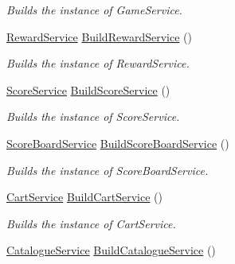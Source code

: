 \begin{DoxyCompactItemize}
\begin{DoxyCompactList}\small\item\em Builds the instance of Game\+Service. \end{DoxyCompactList}\item 
\hyperlink{classcom_1_1shephertz_1_1app42_1_1paas_1_1sdk_1_1csharp_1_1reward_1_1_reward_service}{Reward\+Service} \hyperlink{classcom_1_1shephertz_1_1app42_1_1paas_1_1sdk_1_1csharp_1_1_service_a_p_i_a2e03bda67eea7674af14efbcc43b5c02}{Build\+Reward\+Service} ()
\begin{DoxyCompactList}\small\item\em Builds the instance of Reward\+Service. \end{DoxyCompactList}\item 
\hyperlink{classcom_1_1shephertz_1_1app42_1_1paas_1_1sdk_1_1csharp_1_1game_1_1_score_service}{Score\+Service} \hyperlink{classcom_1_1shephertz_1_1app42_1_1paas_1_1sdk_1_1csharp_1_1_service_a_p_i_afb32cca0b10ba7b2dff5e0f0be9362ea}{Build\+Score\+Service} ()
\begin{DoxyCompactList}\small\item\em Builds the instance of Score\+Service. \end{DoxyCompactList}\item 
\hyperlink{classcom_1_1shephertz_1_1app42_1_1paas_1_1sdk_1_1csharp_1_1game_1_1_score_board_service}{Score\+Board\+Service} \hyperlink{classcom_1_1shephertz_1_1app42_1_1paas_1_1sdk_1_1csharp_1_1_service_a_p_i_a1a3c3f63cdb298efb3fa1cdff556b637}{Build\+Score\+Board\+Service} ()
\begin{DoxyCompactList}\small\item\em Builds the instance of Score\+Board\+Service. \end{DoxyCompactList}\item 
\hyperlink{classcom_1_1shephertz_1_1app42_1_1paas_1_1sdk_1_1csharp_1_1shopping_1_1_cart_service}{Cart\+Service} \hyperlink{classcom_1_1shephertz_1_1app42_1_1paas_1_1sdk_1_1csharp_1_1_service_a_p_i_a6c36d2f5c6478af056982ec45f548ff5}{Build\+Cart\+Service} ()
\begin{DoxyCompactList}\small\item\em Builds the instance of Cart\+Service. \end{DoxyCompactList}\item 
\hyperlink{classcom_1_1shephertz_1_1app42_1_1paas_1_1sdk_1_1csharp_1_1shopping_1_1_catalogue_service}{Catalogue\+Service} \hyperlink{classcom_1_1shephertz_1_1app42_1_1paas_1_1sdk_1_1csharp_1_1_service_a_p_i_a34295d133e506128da84fac5620a896c}{Build\+Catalogue\+Service} ()

\end{DoxyCompactItemize}
